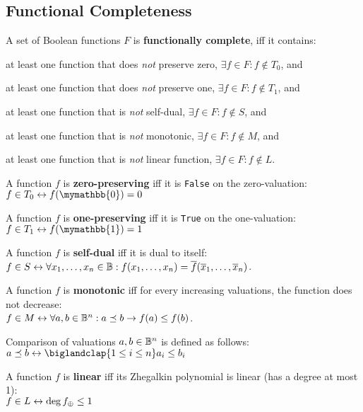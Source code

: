 \documentclass[a4paper,10pt]{article}
\begin{document}
\newpage
\subsection{Functional Completeness}

\begin{terms}
    \item A set of Boolean functions $F$ is \textbf{functionally complete}, iff it contains:
    \begin{terms}
        \item at least one function that does \textit{not} preserve zero, \ie $\exists f \in F: f \notin T_0$, and
        \item at least one function that does \textit{not} preserve one, \ie $\exists f \in F: f \notin T_1$, and
        \item at least one function that is \textit{not} self-dual, \ie $\exists f \in F: f \notin S$, and
        \item at least one function that is \textit{not} monotonic, \ie $\exists f \in F: f \notin M$, and
        \item at least one function that is \textit{not} linear function, \ie $\exists f \in F: f \notin L$.
    \end{terms}

    \item A function $f$ is \textbf{zero-preserving} iff it is \texttt{False} on the zero-valuation: \\
    $f \in T_0 \iff f(\mymathbb{0}) = 0$

    \item A function $f$ is \textbf{one-preserving} iff it is \texttt{True} on the one-valuation: \\
    $f \in T_1 \iff f(\mymathbb{1}) = 1$

    \item A function $f$ is \textbf{self-dual} iff it is dual to itself: \\
    $f \in S \mathrel{\leftrightarrow} \forall x_1,\dotsc,x_n \in \mathbb{B} : f(x_1, \dotsc, x_n) = \overline{f}(\overline{x}_1, \dotsc, \overline{x}_n)$.

    \item A function $f$ is \textbf{monotonic} iff for every increasing valuations, the function does not decrease: \\
    $f \in M \mathrel{\leftrightarrow} \forall a,b \in \mathbb{B}^n: a \preceq b \mathrel{\rightarrow} f(a) \leq f(b)$.

    \begin{terms}
        \item Comparison of valuations $a,b \in \mathbb{B}^n$ is defined as follows: \\
        $a \preceq b \iff \biglandclap{1 \leq i \leq n} a_i \leq b_i$
    \end{terms}


    \item A function $f$ is \textbf{linear} iff its Zhegalkin polynomial is linear (\ie has a degree at most 1): \\
    $f \in L \mathrel{\leftrightarrow} \operatorname{deg} f_{\oplus} \leq 1$
\end{terms}
\end{document}

